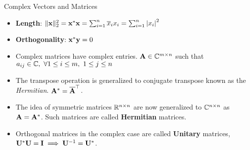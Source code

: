\documentclass[aspectratio=169]{beamer}
\let\olditem\item
\renewcommand{\item}{\setlength{\itemsep}{\fill}\olditem}
\def\mf{\ensuremath\mathbf}
\def\mb{\ensuremath\mathbb}
\begin{document}
  
  \begin{frame}[t]{Complex Vectors and Matrices}
  \begin{itemize}
      \item \textbf{Length}: $\Vert \mf{x} \Vert_2^2 = \mf{x}^{*}\mf{x} = \sum_{i=1}^n\overline{x}_ix_i = \sum_{i=1}^n\left\lvert x_i\right\rvert^2$
  
      \item \textbf{Orthogonality}: $\mf{x}^{*}\mf{y} = 0$
  
      \item Complex matrices have complex entries. $\mf{A} \in \mb{C}^{m \times n}$ such that $a_{ij} \in \mb{C}, \,\, \forall 1 \leq i \leq m, \,\, 1 \leq j \leq n$
  
      \item The transpose operation is generalized to conjugate transpose known as the \textit{Hermitian}. $\mf{A}^{*} = \overline{\mf{A}}^\top$.
      
      \item The idea of symmetric matrices $\mb{R}^{n \times n}$ are now generalized to $\mb{C}^{n \times n}$  as $\mf{A} = \mf{A}^{*}$. Such matrices are called \textbf{Hermitian} matrices.
  
      \item Orthogonal matrices in the complex case are called \textbf{Unitary} matrices, $\mf{U}^{*}\mf{U} = \mf{I} \implies \mf{U}^{-1} = \mf{U}^{*}$.
  \end{itemize}
  \end{frame}
\end{document}
